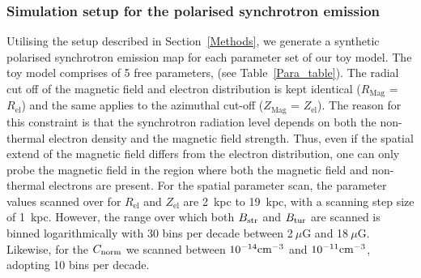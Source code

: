 \documentclass[usenatbib]{mnras}
\begin{document}
\subsubsection{Simulation setup for the polarised synchrotron emission}
Utilising the setup described in Section~\ref{Methods}, we generate a synthetic polarised synchrotron emission map for each parameter set of our toy model. The toy model comprises of 5 free parameters, (see Table~\ref{Para_table}). The radial cut off of the magnetic field and electron distribution is kept identical ($R_{\mathrm{Mag}}$ = $R_{\mathrm{el}}$) and the same applies to the azimuthal cut-off ($Z_{\mathrm{Mag}}$ = $Z_{\mathrm{el}}$). The reason for this constraint is that the synchrotron radiation level depends on both the non-thermal electron density and the magnetic field strength. Thus, even if the spatial extend of the magnetic field differs from the electron distribution, one can only probe the magnetic field in the region where both the magnetic field and non-thermal electrons are present. 
For the spatial parameter scan, the parameter values scanned over for $R_{\mathrm{el}}$ and $Z_{\mathrm{el}}$ are 2~kpc to 19~kpc, with a scanning step size of 1~kpc. 
However, the range over which both $B_{\rm str}$ and $B_{\rm tur}$ are scanned is binned logarithmically with 30 bins per decade between 2$~\mu$G and 18$~\mu$G. Likewise, for the $C_{\rm norm}$ we scanned between $10^{-14} \rm cm^{-3}$ and $10^{-11} \rm cm^{-3}$, adopting 10 bins per decade. 

\end{document}
